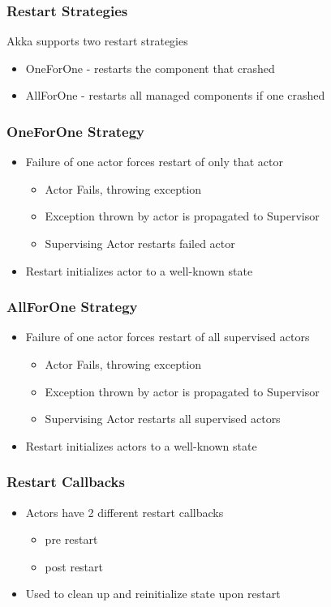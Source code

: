\documentclass{beamer}
\begin{document}
\frame
{
  \frametitle{Restart Strategies}
  Akka supports two restart strategies
  \begin{itemize}
  \item OneForOne - restarts the component that crashed
  \item AllForOne - restarts all managed components if one crashed
  \end{itemize}
}

\frame
{
  \frametitle{OneForOne Strategy}
  \begin{itemize}
  \item Failure of one actor forces restart of only that actor
    \begin{itemize}
       \item Actor Fails, throwing exception
       \item Exception thrown by actor is propagated to Supervisor
       \item Supervising Actor restarts failed actor
    \end{itemize}
  \item Restart initializes actor to a well-known state
  \end{itemize}
}

\frame
{
  \frametitle{AllForOne Strategy}
  \begin{itemize}
  \item Failure of one actor forces restart of all supervised actors
    \begin{itemize}
       \item Actor Fails, throwing exception
       \item Exception thrown by actor is propagated to Supervisor
       \item Supervising Actor restarts all supervised actors
    \end{itemize}
  \item Restart initializes actors to a well-known state
  \end{itemize}
}

\frame
{
  \frametitle{Restart Callbacks}
  \begin{itemize}
  \item Actors have 2 different restart callbacks
    \begin{itemize}
       \item pre restart
       \item post restart
    \end{itemize}
  \item Used to clean up and reinitialize state upon restart
  \end{itemize}
}
\end{document}
